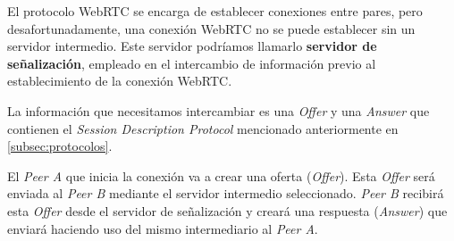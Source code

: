 \documentclass[a4paper, 12pt]{book}
\begin{document}
El protocolo WebRTC se encarga de establecer conexiones entre pares, pero desafortunadamente, una conexión WebRTC no se puede establecer sin un servidor intermedio. Este servidor podríamos llamarlo \textbf{servidor de señalización}, empleado en el intercambio de información previo al establecimiento de la conexión WebRTC.

La información que necesitamos intercambiar es una \textit{Offer} y una \textit{Answer} que contienen el \textit{Session Description Protocol} mencionado anteriormente en \ref{subsec:protocolos}.

El \textit{Peer A} que inicia la conexión va a crear una oferta (\textit{Offer}). Esta \textit{Offer} será enviada al \textit{Peer B} mediante el servidor intermedio seleccionado. \textit{Peer B} recibirá esta \textit{Offer} desde el servidor de señalización y creará una respuesta (\textit{Answer}) que enviará haciendo uso del mismo intermediario al \textit{Peer A}.
\end{document}
